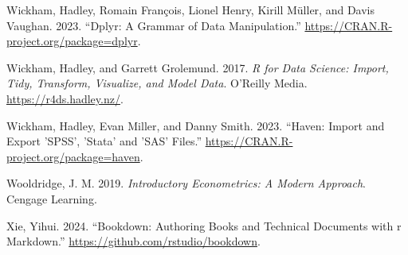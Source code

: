 \documentclass[
  letterpaper,
]{book}
\newlength{\cslhangindent}
\newenvironment{CSLReferences}[2] %
 {\begin{list}{}{%
  \setlength{\itemindent}{0pt}
  \setlength{\leftmargin}{0pt}
  \setlength{\parsep}{0pt}
  \ifodd #1
   \setlength{\leftmargin}{\cslhangindent}
   \setlength{\itemindent}{-1\cslhangindent}
  \fi
  \setlength{\itemsep}{#2\baselineskip}}}
 {\end{list}}
\begin{document}
\begin{CSLReferences}{1}{0}
Wickham, Hadley, Romain François, Lionel Henry, Kirill Müller, and Davis
Vaughan. 2023. {``Dplyr: A Grammar of Data Manipulation.''}
\url{https://CRAN.R-project.org/package=dplyr}.

Wickham, Hadley, and Garrett Grolemund. 2017. \emph{R for Data Science:
Import, Tidy, Transform, Visualize, and Model Data}. O'Reilly Media.
\url{https://r4ds.hadley.nz/}.

Wickham, Hadley, Evan Miller, and Danny Smith. 2023. {``Haven: Import
and Export 'SPSS', 'Stata' and 'SAS' Files.''}
\url{https://CRAN.R-project.org/package=haven}.

Wooldridge, J. M. 2019. \emph{Introductory Econometrics: A Modern
Approach}. Cengage Learning.

Xie, Yihui. 2024. {``Bookdown: Authoring Books and Technical Documents
with r Markdown.''} \url{https://github.com/rstudio/bookdown}.

\end{CSLReferences}


\backmatter
\end{document}
